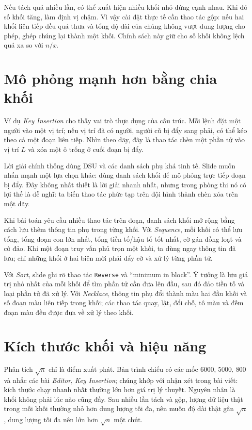 \documentclass[11pt]{article}
\begin{document}
Nếu tách quá nhiều lần, có thể xuất hiện nhiều khối nhỏ đứng cạnh nhau. Khi
đó số khối tăng, làm định vị chậm. Vì vậy cài đặt thực tế cần thao tác gộp:
nếu hai khối liên tiếp đều quá thưa và tổng độ dài của chúng không vượt dung
lượng cho phép, ghép chúng lại thành một khối. Chính sách này giữ cho số khối
không lệch quá xa so với \(n/x\).

\section{Mô phỏng mạnh hơn bằng chia khối}

Ví dụ \textit{Key Insertion} cho thấy vai trò thực dụng của cấu trúc. Mỗi lệnh
đặt một người vào một vị trí; nếu vị trí đã có người, người cũ bị đẩy sang
phải, có thể kéo theo cả một đoạn liên tiếp. Nhìn theo dãy, đây là thao tác
chèn một phần tử vào vị trí \(L\) và xóa một ô trống ở cuối đoạn bị đẩy.

Lời giải chính thống dùng DSU và các danh sách phụ khá tinh tế. Slide muốn
nhấn mạnh một lựa chọn khác: dùng danh sách khối để mô phỏng trực tiếp đoạn
bị đẩy. Đây không nhất thiết là lời giải nhanh nhất, nhưng trong phòng thi nó
có lợi thế là dễ nghĩ: ta biến thao tác phức tạp trên đội hình thành chèn xóa
trên một dãy.

Khi bài toán yêu cầu nhiều thao tác trên đoạn, danh sách khối mở rộng bằng
cách lưu thêm thông tin phụ trong từng khối. Với \textit{Sequence}, mỗi khối
có thể lưu tổng, tổng đoạn con lớn nhất, tổng tiền tố/hậu tố tốt nhất, cờ gán
đồng loạt và cờ đảo. Khi một đoạn truy vấn phủ trọn một khối, ta dùng ngay
thông tin đã lưu; chỉ những khối ở hai biên mới phải đẩy cờ và xử lý từng
phần tử.

Với \textit{Sort}, slide ghi rõ thao tác \texttt{Reverse} và ``minimum in
block''. Ý tưởng là lưu giá trị nhỏ nhất của mỗi khối để tìm phần tử cần đưa
lên đầu, sau đó đảo tiền tố và loại phần tử đã xử lý. Với \textit{Necklace},
thông tin phụ đổi thành màu hai đầu khối và số đoạn màu liên tiếp trong khối;
các thao tác quay, lật, đổi chỗ, tô màu và đếm đoạn màu đều được đưa về xử lý
theo khối.

\section{Kích thước khối và hiệu năng}

Phân tích \(\sqrt n\) chỉ là điểm xuất phát. Bản trình chiếu có các mốc
\(6000\), \(5000\), \(800\) và nhắc các bài \textit{Editor}, \textit{Key
Insertion}; chúng khớp với nhận xét trong bài viết: kích thước chạy nhanh
nhất thường lớn hơn giá trị lý thuyết. Nguyên nhân là khối không phải lúc nào
cũng đầy. Sau nhiều lần tách và gộp, lượng dữ liệu thật trong mỗi khối thường
nhỏ hơn dung lượng tối đa, nên muốn độ dài thật gần \(\sqrt n\), dung lượng
tối đa nên lớn hơn \(\sqrt n\) một chút.
\end{document}
